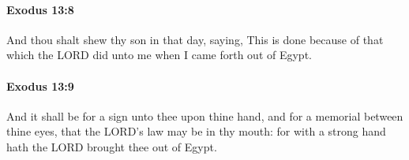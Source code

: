 		\paragraph{Exodus 13:8} %
			\label{EXODUS-13-8}

			And thou shalt shew thy son in that day, saying, This is done because of that which the LORD did unto me when I came forth out of Egypt.


		\paragraph{Exodus 13:9} %
			\label{EXODUS-13-9}

			And it shall be for a sign unto thee upon thine hand, and for a memorial between thine eyes, that the LORD's law may be in thy mouth: for with a strong hand hath the LORD brought thee out of Egypt.


